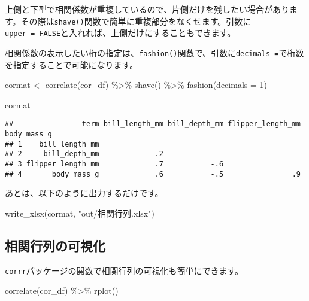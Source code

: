 \documentclass[
  xelatex,ja=standard, b5paper]{bxjsbook}
\newenvironment{Shaded}{\begin{snugshade}}{\end{snugshade}}
\newcommand{\AttributeTok}[1]{\textcolor[rgb]{0.77,0.63,0.00}{#1}}
\newcommand{\DecValTok}[1]{\textcolor[rgb]{0.00,0.00,0.81}{#1}}
\newcommand{\FunctionTok}[1]{\textcolor[rgb]{0.00,0.00,0.00}{#1}}
\newcommand{\NormalTok}[1]{#1}
\newcommand{\OtherTok}[1]{\textcolor[rgb]{0.56,0.35,0.01}{#1}}
\newcommand{\SpecialCharTok}[1]{\textcolor[rgb]{0.00,0.00,0.00}{#1}}
\newcommand{\StringTok}[1]{\textcolor[rgb]{0.31,0.60,0.02}{#1}}
\begin{document}
上側と下型で相関係数が重複しているので、片側だけを残したい場合があります。その際は\texttt{shave()}関数で簡単に重複部分をなくせます。引数に\texttt{upper\ =\ FALSE}と入れれば、上側だけにすることもできます。

相関係数の表示したい桁の指定は、\texttt{fashion()}関数で、引数に\texttt{decimals\ =}で桁数を指定することで可能になります。

\begin{Shaded}
\begin{Highlighting}[]
\NormalTok{cormat }\OtherTok{\textless{}{-}} 
\FunctionTok{correlate}\NormalTok{(cor\_df) }\SpecialCharTok{\%\textgreater{}\%} 
  \FunctionTok{shave}\NormalTok{() }\SpecialCharTok{\%\textgreater{}\%} 
  \FunctionTok{fashion}\NormalTok{(}\AttributeTok{decimals =} \DecValTok{1}\NormalTok{)}

\NormalTok{cormat}
\end{Highlighting}
\end{Shaded}

\begin{verbatim}
##                term bill_length_mm bill_depth_mm flipper_length_mm body_mass_g
## 1    bill_length_mm                                                           
## 2     bill_depth_mm            -.2                                            
## 3 flipper_length_mm             .7           -.6                              
## 4       body_mass_g             .6           -.5                .9
\end{verbatim}

あとは、以下のように出力するだけです。

\begin{Shaded}
\begin{Highlighting}[]
\FunctionTok{write\_xlsx}\NormalTok{(cormat, }\StringTok{"out/相関行列.xlsx"}\NormalTok{)}
\end{Highlighting}
\end{Shaded}

\hypertarget{ux76f8ux95a2ux884cux5217ux306eux53efux8996ux5316}{%
\subsection{相関行列の可視化}\label{ux76f8ux95a2ux884cux5217ux306eux53efux8996ux5316}}

\texttt{corrr}パッケージの関数で相関行列の可視化も簡単にできます。

\begin{Shaded}
\begin{Highlighting}[]
\FunctionTok{correlate}\NormalTok{(cor\_df) }\SpecialCharTok{\%\textgreater{}\%} 
  \FunctionTok{rplot}\NormalTok{()}
\end{Highlighting}
\end{Shaded}
\end{document}
